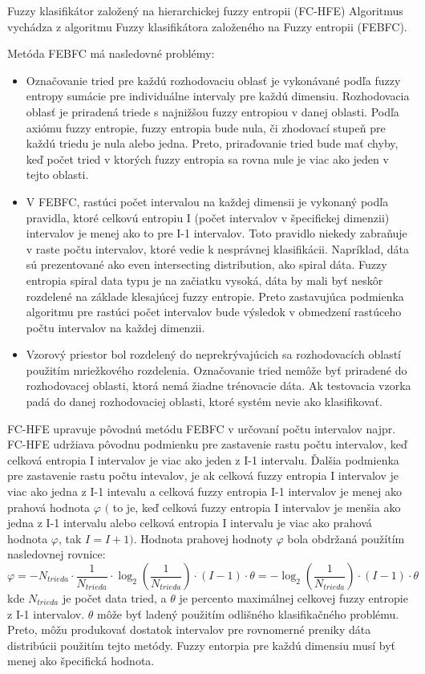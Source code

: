 Fuzzy klasifikátor založený na hierarchickej fuzzy entropii (FC-HFE)
Algoritmus vychádza z algoritmu Fuzzy klasifikátora založeného na Fuzzy entropii (FEBFC). 

Metóda FEBFC má nasledovné problémy: 
\begin{itemize}
\item Označovanie tried pre každú rozhodovaciu oblasť je vykonávané podľa fuzzy entropy sumácie pre individuálne intervaly pre každú dimensiu. Rozhodovacia oblasť je priradená triede s najnižšou fuzzy entropiou v danej oblasti. Podľa axiómu fuzzy entropie, fuzzy entropia bude nula, či zhodovací stupeň pre každú triedu je nula alebo jedna. Preto, priraďovanie tried bude mať chyby, keď počet tried v ktorých fuzzy entropia sa rovna nule je viac ako jeden v tejto oblasti. 

\item V FEBFC, rastúci počet intervalou na každej dimensii je vykonaný podľa pravidla, ktoré celkovú entropiu I (počet intervalov v špecifickej dimenzii) intervalov je menej ako to pre I-1 intervalov. Toto pravidlo niekedy zabraňuje v raste počtu intervalov, ktoré vedie k nesprávnej klasifikácii. Napríklad, dáta sú prezentované ako even intersecting distribution, ako spiral dáta.  Fuzzy entropia spiral data typu je na začiatku vysoká, dáta by mali byť neskôr rozdelené na základe klesajúcej fuzzy entropie. Preto zastavujúca podmienka algoritmu pre rastúci počet intervalov bude výsledok v obmedzení rastúceho počtu intervalov na každej dimenzii. 

\item Vzorový priestor bol rozdelený do neprekrývajúcich sa rozhodovacích oblastí použitím mriežkového rozdelenia. Označovanie tried nemôže byť priradené do rozhodovacej oblasti, ktorá nemá žiadne trénovacie dáta. Ak testovacia vzorka padá do danej rozhodovaciej oblasti, ktoré systém nevie ako klasifikovať. 
\end{itemize}

FC-HFE upravuje pôvodnú metódu FEBFC v určovaní počtu intervalov najpr. FC-HFE udržiava pôvodnu podmienku pre zastavenie rastu počtu intervalov, keď celková entropia I intervalov je viac ako jeden z I-1 intervalu. Ďalšia podmienka pre zastavenie rastu počtu intevalov, je ak celková fuzzy entropia I intervalov je viac ako jedna z I-1 intevalu a celková fuzzy entropia I-1 intervalov je menej ako prahová hodnota  $\varphi$ $($ to je, keď celková fuzzy entropia I intervalov je menšia ako jedna z I-1 intervalu alebo celková entropia I intervalu je viac ako prahová hodnota $\varphi$, tak $I=I+1)$. Hodnota prahovej hodnoty $\varphi$ bola obdržaná použítím nasledovnej rovnice:$$\varphi= -N_{trieda}\cdot \frac{1}{N_{trieda}} \cdot \log_2{(\frac{1}{N_{trieda}})}\cdot (I-1) \cdot \theta = - \log_2{(\frac{1}{N_{trieda}})}\cdot(I-1)\cdot\theta$$
kde $N_{trieda}$ je počet data tried, a $\theta$ je percento maximálnej celkovej fuzzy entropie z I-1 intervalov. $\theta$ môže byť ladený použitím odlišného klasifikačného problému. Preto, môžu produkovať dostatok intervalov pre rovnomerné preniky dáta distribúcii použitím tejto metódy. Fuzzy entorpia pre každú dimensiu musí byť menej ako špecifická hodnota. 

